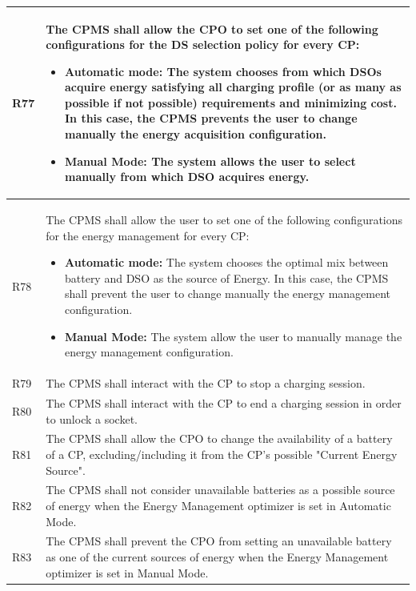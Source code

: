 \documentclass{Configuration_Files/PoliMi3i_thesis}
\begin{document}
\begin{xltabular}{\textwidth}{| >{}l | X |}
R77 &
    The CPMS shall allow the CPO to set one of the following configurations for the DS selection policy for every CP:
    \begin{itemize}
        \item \textbf{Automatic mode:} The system chooses from which DSOs acquire energy satisfying all charging profile (or as many as possible if not possible) requirements and minimizing cost. In this case, the CPMS prevents the user to change manually the energy acquisition configuration.
        \item \textbf{Manual Mode:} The system allows the user to select manually from which DSO acquires energy.
    \end{itemize}\B\\
\hline
    
R78 &
    The CPMS shall allow the user to set one of the following configurations for the energy management  for every CP:
    \begin{itemize}
        \item \textbf{Automatic mode:} The system chooses the optimal mix between battery and DSO as the source of Energy. In this case, the CPMS shall prevent the user to change manually the energy management configuration.
        \item \textbf{Manual Mode:} The system allow the user to manually  manage the energy management configuration.
    \end{itemize}\B\\
\hline

R79 &
    The CPMS shall interact with the CP to stop a charging session.\B\\
\hline

R80 &
    The CPMS shall interact with the CP to end a charging session in order to unlock a socket.\B\\
\hline

R81 &
    The CPMS shall allow the CPO to change the availability of a battery of a CP, excluding/including it from the CP's possible "Current Energy Source".\B\\
\hline
    
R82 &
    The CPMS shall not consider unavailable batteries as  a possible source of energy when the Energy Management optimizer is set in Automatic Mode.\B\\
\hline

R83 &
    The CPMS shall prevent the CPO from setting an unavailable battery as one of the current sources of energy when the Energy Management optimizer is set in Manual Mode.\B\\
\hline


\end{xltabular}
\end{document}
